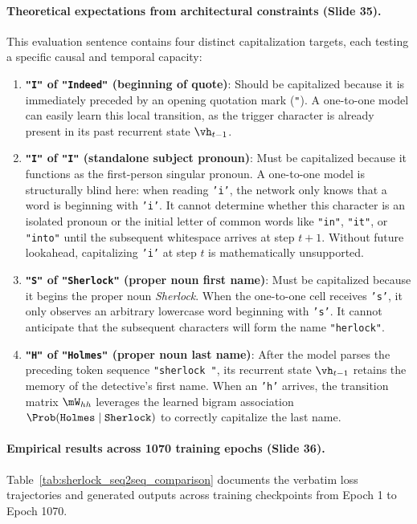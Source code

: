 \documentclass[../../main.tex]{subfiles}
\begin{document}
\paragraph{Theoretical expectations from architectural constraints (Slide 35).}
This evaluation sentence contains four distinct capitalization targets, each testing a specific causal and temporal capacity:
\begin{enumerate}
    \item \textbf{\texttt{"I"} of \texttt{"Indeed"} (beginning of quote)}: Should be capitalized because it is immediately preceded by an opening quotation mark (\texttt{"}). A one-to-one model can easily learn this local transition, as the trigger character is already present in its past recurrent state $\vh_{t-1}$.
    \item \textbf{\texttt{"I"} of \texttt{"I"} (standalone subject pronoun)}: Must be capitalized because it functions as the first-person singular pronoun. A one-to-one model is structurally blind here: when reading \texttt{'i'}, the network only knows that a word is beginning with \texttt{'i'}. It cannot determine whether this character is an isolated pronoun or the initial letter of common words like \texttt{"in"}, \texttt{"it"}, or \texttt{"into"} until the subsequent whitespace arrives at step $t+1$. Without future lookahead, capitalizing \texttt{'i'} at step $t$ is mathematically unsupported.
    \item \textbf{\texttt{"S"} of \texttt{"Sherlock"} (proper noun first name)}: Must be capitalized because it begins the proper noun \textit{Sherlock}. When the one-to-one cell receives \texttt{'s'}, it only observes an arbitrary lowercase word beginning with \texttt{'s'}. It cannot anticipate that the subsequent characters will form the name \texttt{"herlock"}.
    \item \textbf{\texttt{"H"} of \texttt{"Holmes"} (proper noun last name)}: After the model parses the preceding token sequence \texttt{"sherlock "}, its recurrent state $\vh_{t-1}$ retains the memory of the detective's first name. When an \texttt{'h'} arrives, the transition matrix $\mW_{hh}$ leverages the learned bigram association $\Prob(\text{\texttt{Holmes}} \mid \text{\texttt{Sherlock}})$ to correctly capitalize the last name.
\end{enumerate}

\paragraph{Empirical results across 1070 training epochs (Slide 36).}
Table~\ref{tab:sherlock_seq2seq_comparison} documents the verbatim loss trajectories and generated outputs across training checkpoints from Epoch 1 to Epoch 1070.
\end{document}
